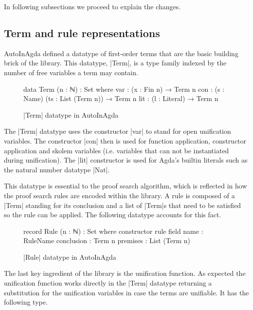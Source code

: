\documentclass[12pt]{article}
\begin{document}
In following subsections we proceed to explain the changes.

\subsection{Term and rule representations}

AutoInAgda defined a datatype of first-order terms that are the basic building
brick of the library. This datatype, |Term|, is a type family indexed by the
number of free variables a term may contain.

\begin{figure}[h]
\label{fig:term:AutoInAgda}
\begin{code}
  data Term (n : ℕ) : Set where
      var : (x : Fin n) → Term n
      con : (s : Name) (ts : List (Term n)) → Term n
      lit : (l : Literal) → Term n
\end{code}
  \caption{|Term| datatype in AutoInAgda}
\end{figure}

The |Term| datatype uses the constructor |var| to stand for open unification
variables. The constructor |con| then is used for function application,
constructor application and skolem variables (i.e. variables that can not be
instantiated during unification). The |lit| constructor is used for Agda's builtin
literals such as the natural number datatype |Nat|.

This datatype is essential to the proof search algorithm, which is
reflected in how the proof search rules are encoded within the library. A rule
is composed of a |Term| standing for its conclusion and a list of |Term|s that
need to be satisfied so the rule can be applied.
The following datatype accounts for this fact.

\begin{figure}[h]
\label{fig:term:Rule}
\begin{code}
  record Rule (n : ℕ) : Set where
    constructor rule
    field
      name        : RuleName
      conclusion  : Term n
      premises    : List (Term n)
\end{code}
  \caption{|Rule| datatype in AutoInAgda}
\end{figure}

The last key ingredient of the library is the unification function. As expected
the unification function works directly in the |Term| datatype returning a
substitution for the unification variables in case the terms are unifiable. It
has the following type.
\end{document}
